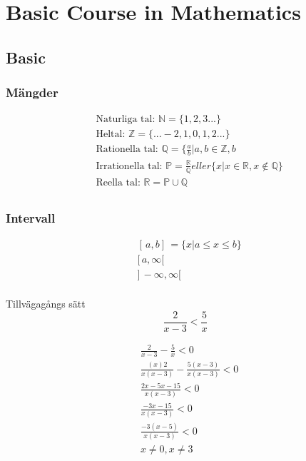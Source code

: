 \chapter{Basic Course in Mathematics}

\newpage

\begin{multicols}{2}
\section{Basic}
\subsection{Mängder}
\begin{align*}
  &\text{Naturliga tal: } \mathbb{N} = \{ 1, 2 , 3 ...  \} \\
  &\text{Heltal: }\mathbb{Z} = \{... -2, 1, 0, 1, 2 ...  \} \\
  &\text{Rationella tal: }\mathbb{Q} = \{ \frac{a}{b} | a,b \in \mathbb{Z}, b \\
  &\text{Irrationella tal: }\mathbb{P} = \frac{\mathbb{R}}{\mathbb{Q}}eller \{ x | x \in \mathbb{R}, x \notin \mathbb{Q} \} \\
  &\text{Reella tal: }\mathbb{R} =  \mathbb{P} \cup \mathbb{Q} \\
\end{align*}

\subsection{Intervall}
\begin{align*}
  &[ \, a, b ] \, = \{ x | a \leq x \leq b \} \\
  &[ \, a, \infty [ \, \\
  &] \, -\infty, \infty [ \, \\
\end{align*}

\begin{exampleblock}{Tillvägagångs sätt}
\begin{equation*}
\frac { 2 } { x - 3 } < \frac { 5 } { x }
\end{equation*}

\begin{align*}
&\frac{ 2 }{ x - 3 } - \frac{ 5 }{ x } < 0 \\
&\frac{(x) 2 }{x (x - 3)} - \frac{ 5 ( x - 3 )}{ x ( x - 3 ) } < 0 \\
&\frac{ 2 x - 5 x - 15 }{ x ( x - 3 ) } < 0 \\
&\frac{ - 3 x - 15 }{ x ( x - 3 ) } < 0 \\
&\frac{ - 3 ( x - 5 ) }{ x ( x - 3 ) } < 0 \\
&x \neq 0 , x \neq 3 \\
\end{align*}


\end{exampleblock}
\end{multicols}
